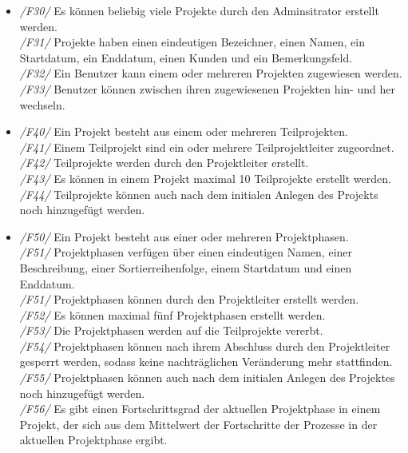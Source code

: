 \begin{itemize}
    \item[] \emph{/F30/} Es können beliebig viele Projekte durch den Adminsitrator erstellt werden.
    \\\emph{/F31/} Projekte haben einen eindeutigen Bezeichner, einen Namen, ein Startdatum, ein Enddatum, einen Kunden und ein Bemerkungsfeld.
    \\\emph{/F32/} Ein Benutzer kann einem oder mehreren Projekten zugewiesen werden.
    \\\emph{/F33/} Benutzer können zwischen ihren zugewiesenen Projekten hin- und her wechseln. 
    \vspace{0.5cm}

    \item[] \emph{/F40/} Ein Projekt besteht aus einem oder mehreren Teilprojekten.
    \\\emph{/F41/} Einem Teilprojekt sind ein oder mehrere Teilprojektleiter zugeordnet.
    \\\emph{/F42/} Teilprojekte werden durch den Projektleiter erstellt.
    \\\emph{/F43/} Es können in einem Projekt maximal 10 Teilprojekte erstellt werden.
    \\\emph{/F44/} Teilprojekte können auch nach dem initialen Anlegen des Projekts noch hinzugefügt werden.
    \vspace{0.5cm}  

    \item[] \emph{/F50/} Ein Projekt besteht aus einer oder mehreren Projektphasen.
    \\\emph{/F51/} Projektphasen verfügen über einen eindeutigen Namen, einer Beschreibung, einer Sortierreihenfolge, einem Startdatum und einen Enddatum.
    \\\emph{/F51/} Projektphasen können durch den Projektleiter erstellt werden.
    \\\emph{/F52/} Es können maximal fünf Projektphasen erstellt werden.
    \\\emph{/F53/} Die Projektphasen werden auf die Teilprojekte vererbt.
    \\\emph{/F54/} Projektphasen können nach ihrem Abschluss durch den Projektleiter gesperrt werden, sodass keine nachträglichen Veränderung mehr stattfinden. 
    \\\emph{/F55/} Projektphasen können auch nach dem initialen Anlegen des Projektes noch hinzugefügt 
    werden.
    \\\emph{/F56/} Es gibt einen Fortschrittsgrad der aktuellen Projektphase in einem Projekt, der sich aus dem Mittelwert der Fortschritte der Prozesse in der aktuellen Projektphase ergibt.
    \vspace{0.5cm} 


\end{itemize}
